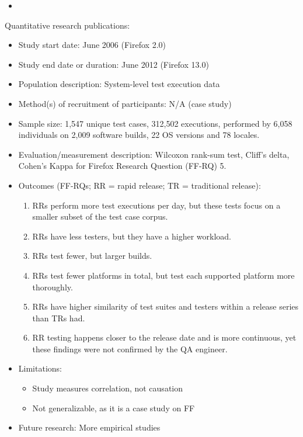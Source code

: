 \documentclass[]{book}
\providecommand{\tightlist}{%
  \setlength{\itemsep}{0pt}\setlength{\parskip}{0pt}}
\begin{document}
\begin{itemize}
\item
\end{itemize}

Quantitative research publications:

\begin{itemize}
\tightlist
\item
  Study start date: June 2006 (Firefox 2.0)
\item
  Study end date or duration: June 2012 (Firefox 13.0)
\item
  Population description: System-level test execution data
\item
  Method(s) of recruitment of participants: N/A (case study)
\item
  Sample size: 1,547 unique test cases, 312,502 executions, performed by
  6,058 individuals on 2,009 software builds, 22 OS versions and 78
  locales.
\item
  Evaluation/measurement description: Wilcoxon rank-sum test, Cliff's
  delta, Cohen's Kappa for Firefox Research Question (FF-RQ) 5.
\item
  Outcomes (FF-RQs; RR = rapid release; TR = traditional release):

  \begin{enumerate}
  \def\labelenumi{\arabic{enumi}.}
  \tightlist
  \item
    RRs perform more test executions per day, but these tests focus on a
    smaller subset of the test case corpus.
  \item
    RRs have less testers, but they have a higher workload.
  \item
    RRs test fewer, but larger builds.
  \item
    RRs test fewer platforms in total, but test each supported platform
    more thoroughly.
  \item
    RRs have higher similarity of test suites and testers within a
    release series than TRs had.
  \item
    RR testing happens closer to the release date and is more
    continuous, yet these findings were not confirmed by the QA
    engineer.
  \end{enumerate}
\item
  Limitations:

  \begin{itemize}
  \tightlist
  \item
    Study measures correlation, not causation
  \item
    Not generalizable, as it is a case study on FF
  \end{itemize}
\item
  Future research: More empirical studies
\end{itemize}
\end{document}
